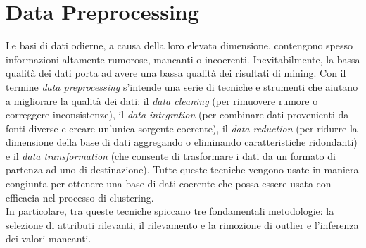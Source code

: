 \section{Data Preprocessing}
\label{data_prepro}
Le basi di dati odierne, a causa della loro elevata dimensione, contengono spesso informazioni altamente rumorose, mancanti o incoerenti. Inevitabilmente, la bassa qualit\`a dei dati porta ad avere una bassa qualit\`a dei risultati di mining. Con il termine \textit{data preprocessing} s'intende una serie di tecniche e strumenti che aiutano a migliorare la qualit\`a dei dati: il \textit{data cleaning} (per rimuovere rumore o correggere inconsistenze), il \textit{data integration} (per combinare dati provenienti da fonti diverse e creare un'unica sorgente coerente), il \textit{data reduction}  (per ridurre la dimensione della base di dati aggregando o eliminando caratteristiche ridondanti) e il \textit{data transformation} (che consente di trasformare i dati da un formato di partenza ad uno di destinazione).
Tutte queste tecniche vengono usate in maniera congiunta per ottenere una base di dati coerente che possa essere usata con efficacia nel processo di clustering.\\
In particolare, tra queste tecniche spiccano tre fondamentali metodologie: la selezione di attributi rilevanti, il rilevamento e la rimozione di outlier e l'inferenza dei valori mancanti.

